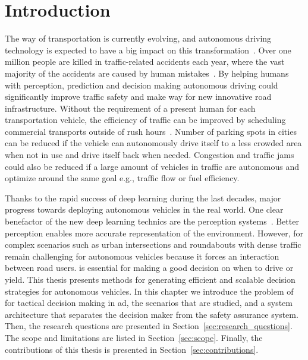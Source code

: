 \chapter{Introduction} \label{ch:intro}
The way of transportation is currently evolving, and autonomous driving technology is expected to have a big impact on this transformation~\cite{traffic21}. Over one million people are killed in traffic-related accidents each year, where the vast majority of the accidents are caused by human mistakes~\cite{WHO2018, NHTSA2018}. By helping humans with perception, prediction and decision making autonomous driving could significantly improve traffic safety and make way for new innovative road infrastructure. Without the requirement of a present human for each transportation vehicle, the efficiency of traffic can be improved by scheduling commercial transports outside of rush hours~\cite{FAGNANT2015167}. Number of parking spots in cities can be reduced if the vehicle can autonomously drive itself to a less crowded area when not in use and drive itself back when needed. Congestion and traffic jams could also be reduced if a large amount of vehicles in traffic are autonomous and optimize around the same goal e.g., traffic flow or fuel efficiency. 


Thanks to the rapid success of deep learning during the last decades, major progress towards deploying autonomous vehicles in the real world. One clear benefactor of the new deep learning technics are the perception systems~\cite{Janai2020}. Better perception enables more accurate representation of the environment. 
However, for complex scenarios such as urban intersections and roundabouts with dense traffic remain challenging for autonomous vehicles because it forces an interaction between road users. 
is essential for making a good decision on when to drive or yield. 
This thesis presents methods for generating efficient and scalable decision strategies for autonomous vehicles. In this chapter we introduce the problem of for tactical decision making in \gls{ad}, the scenarios that are studied, and a system architecture that separates the decision maker from the safety assurance system. Then, the research questions are presented in Section~\ref{sec:research_questions}. The scope and limitations are listed in Section~\ref{sec:scope}. Finally, the contributions of this thesis is presented in Section~\ref{sec:contributions}. 

